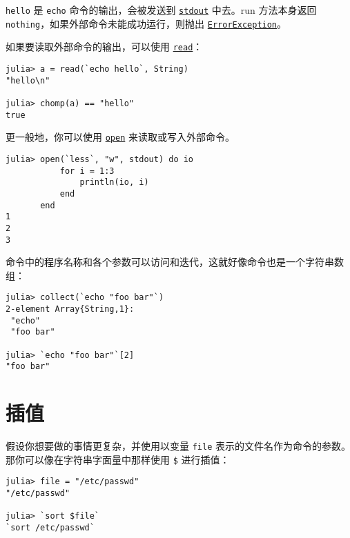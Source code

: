 \texttt{hello} 是 \texttt{echo} 命令的输出，会被发送到 \hyperlink{18181294266083891471}{\texttt{stdout}} 中去。run 方法本身返回 \texttt{nothing}，如果外部命令未能成功运行，则抛出 \hyperlink{12102596058483452470}{\texttt{ErrorException}}。



如果要读取外部命令的输出，可以使用 \hyperlink{8104134490906192097}{\texttt{read}}：




\begin{verbatim}
julia> a = read(`echo hello`, String)
"hello\n"

julia> chomp(a) == "hello"
true
\end{verbatim}



更一般地，你可以使用 \hyperlink{300818094931158296}{\texttt{open}} 来读取或写入外部命令。




\begin{verbatim}
julia> open(`less`, "w", stdout) do io
           for i = 1:3
               println(io, i)
           end
       end
1
2
3
\end{verbatim}



命令中的程序名称和各个参数可以访问和迭代，这就好像命令也是一个字符串数组：




\begin{verbatim}
julia> collect(`echo "foo bar"`)
2-element Array{String,1}:
 "echo"
 "foo bar"

julia> `echo "foo bar"`[2]
"foo bar"
\end{verbatim}



\hypertarget{6373319844820183024}{}


\section{插值}



假设你想要做的事情更复杂，并使用以变量 \texttt{file} 表示的文件名作为命令的参数。那你可以像在字符串字面量中那样使用 \texttt{\$} 进行插值：




\begin{verbatim}
julia> file = "/etc/passwd"
"/etc/passwd"

julia> `sort $file`
`sort /etc/passwd`
\end{verbatim}



